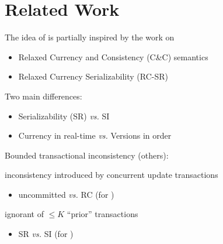 \section{Related Work}

\begin{frame}{}
  The idea of  is partially inspired by the work on 
  \begin{itemize}
    \item Relaxed Currency and Consistency (C\&C) semantics 
    \item Relaxed Currency Serializability (RC-SR) 
  \end{itemize}

  \vspace{0.80cm}
  Two main differences:
  \begin{itemize}
    \item Serializability (SR) \emph{vs.} SI
    \item Currency in real-time \emph{vs.} Versions in order
  \end{itemize}
\end{frame}

\begin{frame}{}
  Bounded transactional inconsistency (others):
  \begin{description}
    \setlength{\itemsep}{8pt}
    \item[Epsilon-SR] inconsistency introduced by concurrent update transactions
       
      \begin{itemize}
	\item uncommitted \emph{vs.} RC (for \rvsi{})
      \end{itemize}
    \item[$N$-ignorant System] ignorant of $\le K$ ``prior'' transactions
      \begin{itemize}
	\item SR \emph{vs.} SI (for \rvsi{})
      \end{itemize}
  \end{description}
\end{frame}

